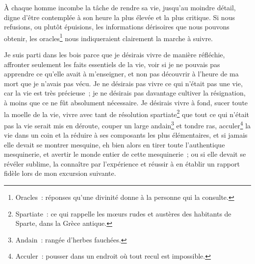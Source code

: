 {

À chaque homme incombe la tâche de rendre sa vie, jusqu'au moindre
détail, digne d'être contemplée à son heure la plus élevée et la plus
critique. Si nous refusions, ou plutôt épuisions, les informations
dérisoires que nous pouvons obtenir, les oracles\footnote{Oracles~:
réponses qu'une divinité donne à la personne qui la consulte.} nous
indiqueraient clairement la marche à suivre.

Je suis parti dans les bois parce que je désirais vivre de manière
réfléchie, affronter seulement les faits essentiels de la vie, voir
si je ne pouvais pas apprendre ce qu'elle avait à m'enseigner, et non
pas découvrir à l'heure de ma mort que je n'avais pas vécu. Je ne
désirais pas vivre ce qui n'était pas une vie, car la vie est très
précieuse~; je ne désirais pas davantage cultiver la résignation, à
moins que ce ne fût absolument nécessaire. Je désirais vivre à fond,
sucer toute la moelle de la vie, vivre avec tant de résolution
spartiate\footnote{Spartiate~: ce qui rappelle les mœurs rudes et
austères des habitants de Sparte, dans la Grèce antique.} que tout ce
qui n'était pas la vie serait mis en déroute, couper un large
andain\footnote{Andain~: rangée d'herbes fauchées.} et tondre ras,
acculer\footnote{Acculer~: pousser dans un endroit où tout recul est
impossible.} la vie dans un coin et la réduire à ses composants les
plus élémentaires, et si jamais elle devait se montrer mesquine, eh
bien alors en tirer toute l'authentique mesquinerie, et avertir le
monde entier de cette mesquinerie~; ou si elle devait se révéler
sublime, la connaître par l'expérience et réussir à en établir un
rapport fidèle lors de mon excursion suivante.
}

